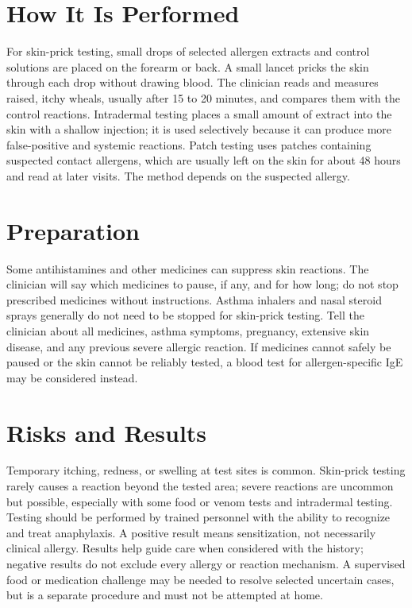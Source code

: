 \section*{How It Is Performed}
For skin-prick testing, small drops of selected allergen extracts and control solutions are placed on the forearm or back. A small lancet pricks the skin through each drop without drawing blood. The clinician reads and measures raised, itchy wheals, usually after 15 to 20 minutes, and compares them with the control reactions. Intradermal testing places a small amount of extract into the skin with a shallow injection; it is used selectively because it can produce more false-positive and systemic reactions. Patch testing uses patches containing suspected contact allergens, which are usually left on the skin for about 48 hours and read at later visits. The method depends on the suspected allergy.

\section*{Preparation}
Some antihistamines and other medicines can suppress skin reactions. The clinician will say which medicines to pause, if any, and for how long; do not stop prescribed medicines without instructions. Asthma inhalers and nasal steroid sprays generally do not need to be stopped for skin-prick testing. Tell the clinician about all medicines, asthma symptoms, pregnancy, extensive skin disease, and any previous severe allergic reaction. If medicines cannot safely be paused or the skin cannot be reliably tested, a blood test for allergen-specific IgE may be considered instead.

\section*{Risks and Results}
Temporary itching, redness, or swelling at test sites is common. Skin-prick testing rarely causes a reaction beyond the tested area; severe reactions are uncommon but possible, especially with some food or venom tests and intradermal testing. Testing should be performed by trained personnel with the ability to recognize and treat anaphylaxis. A positive result means sensitization, not necessarily clinical allergy. Results help guide care when considered with the history; negative results do not exclude every allergy or reaction mechanism. A supervised food or medication challenge may be needed to resolve selected uncertain cases, but is a separate procedure and must not be attempted at home.

